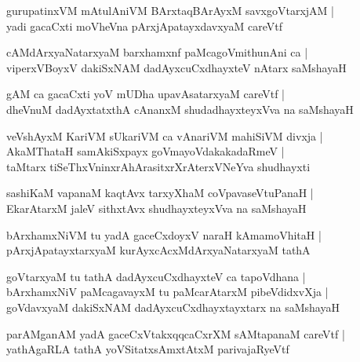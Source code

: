 \begin{shloka}
gurupatinxVM mAtulAniVM BArxtaqBArAyxM savxgoVtarxjAM |\\
yadi gacaCxti moVheVna pArxjApatayxdavxyaM careVtf
\end{shloka}

\begin{shloka}
cAMdArxyaNatarxyaM barxhamxnf paMcagoVmithunAni ca |\\
viperxVBoyxV dakiSxNAM dadAyxcuCxdhayxteV nAtarx saMshayaH 
\end{shloka}

\begin{shloka}
gAM ca gacaCxti yoV mUDha upavAsatarxyaM careVtf |\\
dheVnuM dadAyxtatxthA cAnanxM shudadhayxteyxVva na saMshayaH 
\end{shloka}

\begin{shloka}
veVshAyxM KariVM sUkariVM ca vAnariVM mahiSiVM divxja |\\
AkaMThataH samAkiSxpayx goVmayoVdakakadaRmeV |\\
taMtarx tiSeThxVninxrAhArasitxrXrAterxVNeYva shudhayxti
\end{shloka}

\begin{shloka}
sashiKaM vapanaM kaqtAvx tarxyXhaM coVpavaseVtuPanaH |\\
EkarAtarxM jaleV sithxtAvx shudhayxteyxVva na saMshayaH 
\end{shloka}

\begin{shloka}
bArxhamxNiVM tu yadA gaceCxdoyxV naraH kAmamoVhitaH |\\
pArxjApatayxtarxyaM kurAyxcAcxMdArxyaNatarxyaM tathA 
\end{shloka}

\begin{shloka}
goVtarxyaM tu tathA dadAyxcuCxdhayxteV ca tapoVdhana |\\
bArxhamxNiV paMcagavayxM tu paMcarAtarxM pibeVdidxvXja |\\
goVdavxyaM dakiSxNAM dadAyxcuCxdhayxtayxtarx na saMshayaH
\end{shloka}

\begin{shloka}
parAMganAM yadA gaceCxVtakxqqcaCxrXM sAMtapanaM careVtf |\\
yathAgaRLA tathA yoVSitatxsAmxtAtxM parivajaRyeVtf
\end{shloka}

